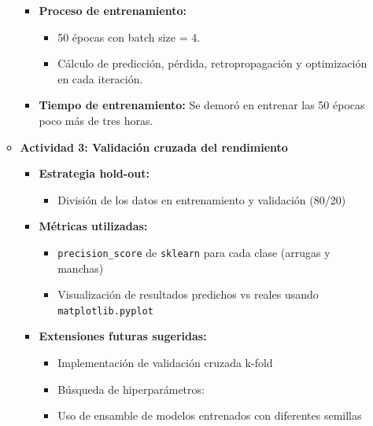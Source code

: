 \begin{enumerate}
\begin{itemize}
\begin{itemize}
      \item \textbf{Proceso de entrenamiento:}
      \begin{itemize}
        \item 50 épocas con batch size = 4.
        \item Cálculo de predicción, pérdida, retropropagación y optimización en cada iteración.
      \end{itemize}
    
      \item \textbf{Tiempo de entrenamiento:}
      Se demoró en entrenar las 50 épocas poco más de tres horas.
    \end{itemize}
  
    \item \textbf{Actividad 3: Validación cruzada del rendimiento}
    \begin{itemize}
      \item \textbf{Estrategia hold-out:}
      \begin{itemize}
        \item División de los datos en entrenamiento y validación (80/20)
      \end{itemize}
  
      \item \textbf{Métricas utilizadas:}
      \begin{itemize}
        \item \texttt{precision\_score} de \texttt{sklearn} para cada clase (arrugas y manchas)
        \item Visualización de resultados predichos vs reales usando \texttt{matplotlib.pyplot}
      \end{itemize}
  
      \item \textbf{Extensiones futuras sugeridas:}
      \begin{itemize}
        \item Implementación de validación cruzada k-fold
        \item Búsqueda de hiperparámetros:
        \item Uso de ensamble de modelos entrenados con diferentes semillas
      \end{itemize}
  
    \end{itemize}
  
  \end{itemize}

\end{enumerate}

